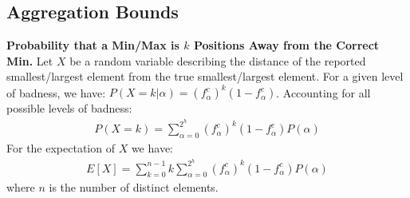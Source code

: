 \documentclass[11pt,twocolumn]{MyTightStyle}
\theoremstyle{plain}
\theoremstyle{definition}
\theoremstyle{remark}
\numberwithin{equation}{section}
\begin{document}


  \subsection{Aggregation Bounds}
  
  {\bf Probability that a Min/Max is $k$ Positions Away from the
  Correct Min.}
  Let $X$ be a random variable describing the distance of the reported
  smallest/largest element from the true smallest/largest element. For
  a given level of badness, we have: $P(X=k|\alpha) = (f_{\alpha}^c)^k(1-f_{\alpha}^c)$. Accounting for all
  possible levels of badness:
  \begin{eqnarray}
    P(X=k)=\sum_{\alpha=0}^{2^h}(f_{\alpha}^c)^k(1-f_{\alpha}^c)P(\alpha)
  \end{eqnarray}
  For the expectation of $X$ we have:
  \begin{eqnarray}
    E[X] = \sum_{k=0}^{n-1}k\sum_{\alpha=0}^{2^h}(f_{\alpha}^c)^k(1-f_{\alpha}^c)P(\alpha)
  \end{eqnarray}
  where $n$ is the number of distinct elements.
%
  
\end{document}
